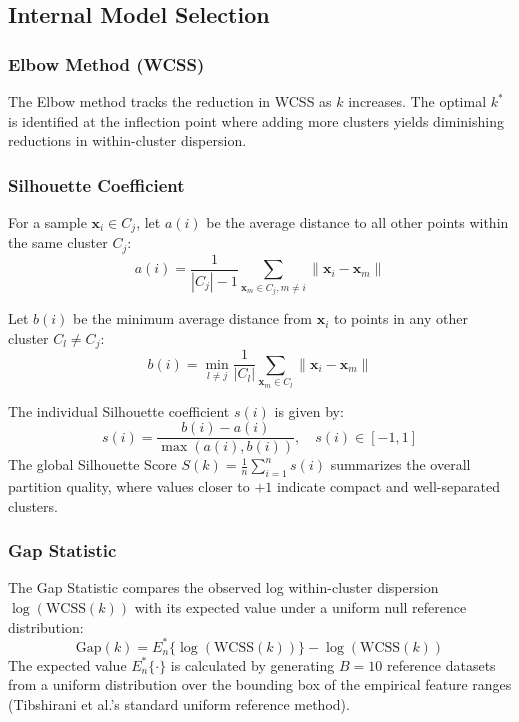 \documentclass[12pt]{ai_conquer2026}
\begin{document}
\subsection{Internal Model Selection}

\subsubsection{Elbow Method (WCSS)}
The Elbow method tracks the reduction in WCSS as $k$ increases. The optimal $k^*$ is identified at the inflection point where adding more clusters yields diminishing reductions in within-cluster dispersion.

\subsubsection{Silhouette Coefficient}
For a sample $\mathbf{x}_i \in C_j$, let $a(i)$ be the average distance to all other points within the same cluster $C_j$:
\begin{equation}
a(i) = \frac{1}{|C_j| - 1} \sum_{\mathbf{x}_m \in C_j, m \neq i} \|\mathbf{x}_i - \mathbf{x}_m\|
\end{equation}

Let $b(i)$ be the minimum average distance from $\mathbf{x}_i$ to points in any other cluster $C_l \neq C_j$:
\begin{equation}
b(i) = \min_{l \neq j} \frac{1}{|C_l|} \sum_{\mathbf{x}_m \in C_l} \|\mathbf{x}_i - \mathbf{x}_m\|
\end{equation}

The individual Silhouette coefficient $s(i)$ is given by:
\begin{equation}
s(i) = \frac{b(i) - a(i)}{\max(a(i), b(i))}, \quad s(i) \in [-1, 1]
\end{equation}
The global Silhouette Score $S(k) = \frac{1}{n}\sum_{i=1}^{n} s(i)$ summarizes the overall partition quality, where values closer to $+1$ indicate compact and well-separated clusters.

\subsubsection{Gap Statistic}
The Gap Statistic \cite{tibshirani2001estimating} compares the observed log within-cluster dispersion $\log(\text{WCSS}(k))$ with its expected value under a uniform null reference distribution:
\begin{equation}
\text{Gap}(k) = E_n^*\{\log(\text{WCSS}(k))\} - \log(\text{WCSS}(k))
\end{equation}
The expected value $E_n^*\{\cdot\}$ is calculated by generating $B = 10$ reference datasets from a uniform distribution over the bounding box of the empirical feature ranges (Tibshirani et al.'s standard uniform reference method).
\end{document}
